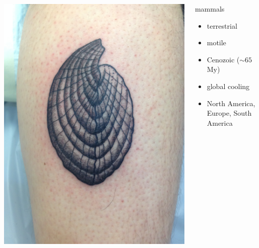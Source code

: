 \documentclass{beamer}
\begin{document}
\begin{frame}
\begin{columns}
\begin{column}{0.5\textwidth}
      \begin{center}
        \includegraphics[height = 0.4\textheight, keepaspectratio = true]{figure/tattoo}
      \end{center}
    \end{column}
    \begin{column}{0.5\textwidth}
      \begin{block}{mammals}
        \begin{itemize}
          \item terrestrial
          \item motile
          \item Cenozoic (\(\sim 65\) My)
          \item global cooling
          \item North America, Europe, South America
        \end{itemize}
      \end{block}


\end{column}
\end{columns}
\end{frame}
\end{document}
